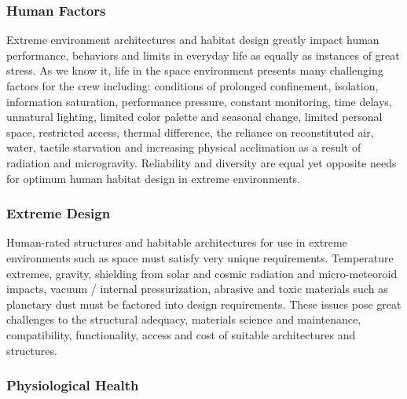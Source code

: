 \documentclass[letter,11pt]{article}
\begin{document}

\subsubsection*{Human Factors}

Extreme environment architectures and habitat design greatly impact human
performance, behaviors and limits in everyday life as equally as instances of
great stress. As we know it, life in the space environment presents many
challenging factors for the crew including: conditions of prolonged
confinement, isolation, information saturation, performance pressure, constant
monitoring, time delays, unnatural lighting, limited color palette and seasonal
change, limited personal space, restricted access, thermal difference, the
reliance on reconstituted air, water, tactile starvation and increasing
physical acclimation as a result of radiation and microgravity. Reliability and
diversity are equal yet opposite needs for optimum human habitat design in
extreme environments.

\subsubsection*{Extreme Design}

Human-rated structures and habitable architectures for use in extreme
environments such as space must satisfy very unique requirements. Temperature
extremes, gravity, shielding from solar and cosmic radiation and
micro-meteoroid impacts, vacuum / internal pressurization, abrasive and toxic
materials such as planetary dust must be factored into design requirements.
These issues pose great challenges to the structural adequacy, materials
science and maintenance, compatibility, functionality, access and cost of
suitable architectures and structures.

 
\subsubsection*{Physiological Health}
\end{document}
